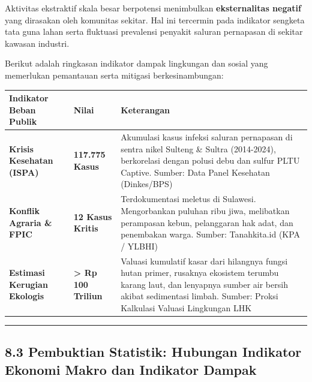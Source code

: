 \documentclass[
]{article}
\newcounter{none} %
\begin{document}
Aktivitas ekstraktif skala besar berpotensi menimbulkan
\textbf{eksternalitas negatif} yang dirasakan oleh komunitas sekitar.
Hal ini tercermin pada indikator sengketa tata guna lahan serta
fluktuasi prevalensi penyakit saluran pernapasan di sekitar kawasan
industri.

Berikut adalah ringkasan indikator dampak lingkungan dan sosial yang
memerlukan pemantauan serta mitigasi berkesinambungan:

{\def\LTcaptype{none} %
\begin{longtable}[]{@{}
  >{\raggedright\arraybackslash}p{}
  >{\raggedright\arraybackslash}p{}
  >{\raggedright\arraybackslash}p{}@{}}
\toprule\noalign{}
\begin{minipage}[b]{\linewidth}\raggedright
Indikator Beban Publik
\end{minipage} & \begin{minipage}[b]{\linewidth}\raggedright
Nilai
\end{minipage} & \begin{minipage}[b]{\linewidth}\raggedright
Keterangan
\end{minipage} \\
\midrule\noalign{}
\endhead
\bottomrule\noalign{}
\endlastfoot
\textbf{Krisis Kesehatan (ISPA)} & \textbf{117.775 Kasus} & Akumulasi
kasus infeksi saluran pernapasan di sentra nikel Sulteng \& Sultra
(2014-2024), berkorelasi dengan polusi debu dan sulfur PLTU Captive.
Sumber: Data Panel Kesehatan (Dinkes/BPS) \\
\textbf{Konflik Agraria \& FPIC} & \textbf{12 Kasus Kritis} &
Terdokumentasi meletus di Sulawesi. Mengorbankan puluhan ribu jiwa,
melibatkan perampasan kebun, pelanggaran hak adat, dan penembakan warga.
Sumber: Tanahkita.id (KPA / YLBHI) \\
\textbf{Estimasi Kerugian Ekologis} & \textbf{\textgreater{} Rp 100
Triliun} & Valuasi kumulatif kasar dari hilangnya fungsi hutan primer,
rusaknya ekosistem terumbu karang laut, dan lenyapnya sumber air bersih
akibat sedimentasi limbah. Sumber: Proksi Kalkulasi Valuasi Lingkungan
LHK \\
\end{longtable}
}

\begin{center}\rule{0.5\linewidth}{0.5pt}\end{center}

\subsection{8.3 Pembuktian Statistik: Hubungan Indikator Ekonomi Makro
dan Indikator
Dampak}\label{pembuktian-statistik-hubungan-indikator-ekonomi-makro-dan-indikator-dampak}
\end{document}
